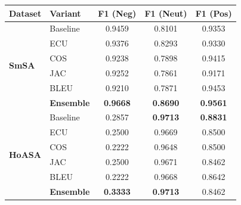 \begin{tabular}{l l c c c}
\toprule
\textbf{Dataset} & \textbf{Variant} & \textbf{F1 (Neg)} & \textbf{F1 (Neut)} & \textbf{F1 (Pos)} \\
\midrule
\multirow{6}{*}{\textbf{SmSA}}
& Baseline & 0.9459 & 0.8101 & 0.9353 \\
& ECU & 0.9376 & 0.8293 & 0.9330 \\
& COS & 0.9238 & 0.7898 & 0.9415 \\
& JAC & 0.9252 & 0.7861 & 0.9171 \\
& BLEU & 0.9210 & 0.7871 & 0.9453 \\
& \textbf{Ensemble} & \textbf{0.9668} & \textbf{0.8690} & \textbf{0.9561} \\
\midrule
\multirow{6}{*}{\textbf{HoASA}}
& Baseline & 0.2857 & \textbf{0.9713} & \textbf{0.8831} \\
& ECU & 0.2500 & 0.9669 & 0.8500 \\
& COS & 0.2222 & 0.9648 & 0.8500 \\
& JAC & 0.2500 & 0.9671 & 0.8462 \\
& BLEU & 0.2222 & 0.9668 & 0.8642 \\
& \textbf{Ensemble} & \textbf{0.3333} & \textbf{0.9713} & 0.8462 \\
\bottomrule
\end{tabular}